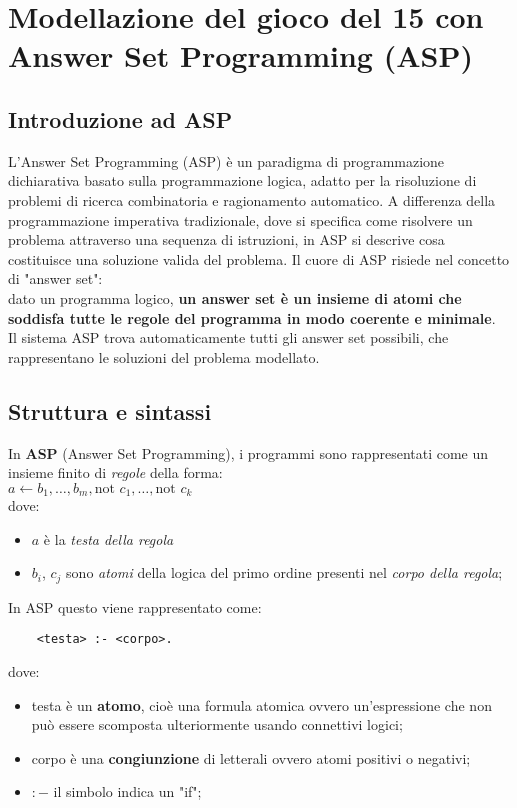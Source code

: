 \chapter{Modellazione del gioco del 15 con Answer Set Programming (ASP)}
\label{asp}

\section{Introduzione ad ASP \cite{12}}
L'Answer Set Programming (ASP) è un paradigma di programmazione dichiarativa basato sulla programmazione logica, adatto per la risoluzione di problemi di ricerca combinatoria e ragionamento automatico. A differenza della programmazione imperativa tradizionale, dove si specifica come risolvere un problema attraverso una sequenza di istruzioni, in ASP si descrive cosa costituisce una soluzione valida del problema.
Il cuore di ASP risiede nel concetto di "answer set":\\
dato un programma logico, \textbf{un answer set è un insieme di atomi che soddisfa tutte le regole del programma in modo coerente e minimale}. \\
Il sistema ASP trova automaticamente tutti gli answer set possibili, che rappresentano le soluzioni del problema modellato.

\section{Struttura e sintassi}
In \textbf{ASP} (Answer Set Programming), i programmi sono rappresentati come un insieme finito di \textit{regole} della forma: ~\cite{11} \\
$a \leftarrow b_1, \dots, b_m, \text{not } c_1, \dots, \text{not }c_k$ \\
dove:
\begin{itemize}
    \item $a$ è la \textit{testa della regola}
    \item $b_i$, $c_j$ sono \textit{atomi} della logica del primo ordine presenti nel \textit{corpo della regola};
\end{itemize} 

In ASP questo viene rappresentato come: ~\cite{12}

\begin{verbatim}
    <testa> :- <corpo>. 
\end{verbatim}

dove: 
\begin{itemize}
    \item testa è un \textbf{atomo}, cioè una formula atomica ovvero un’espressione che non può essere scomposta ulteriormente usando connettivi logici;
    \item corpo è una \textbf{congiunzione} di letterali ovvero atomi positivi o negativi; 
    \item $:-$ il simbolo indica un "if"; 
\end{itemize}

